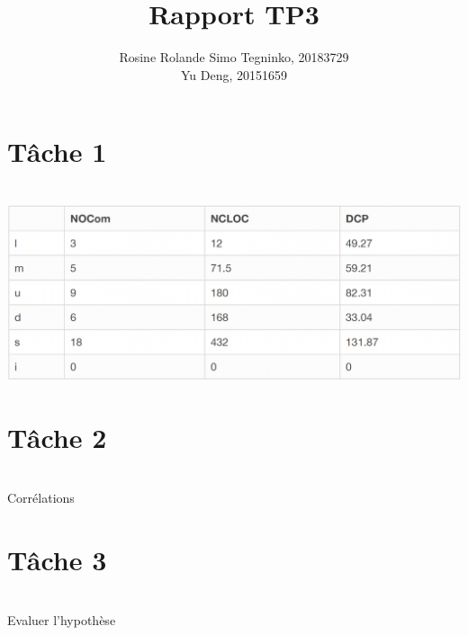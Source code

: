 \documentclass{article}
\title{Rapport TP3}
\author{Rosine Rolande Simo Tegninko, 20183729\\
Yu Deng, 20151659}
\date{}
\begin{document}
\maketitle

\section*{Tâche 1}\\
\includegraphics[scale=0.3]{T1_1.png}


\section*{Tâche 2}\\
Corrélations\\

\section*{Tâche 3}\\
Evaluer l’hypothèse
\end{document}
